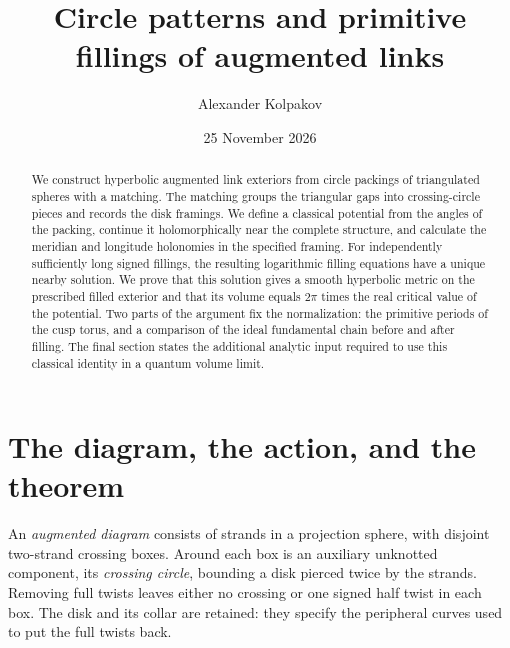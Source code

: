 \documentclass[11pt]{article}
\title{Circle patterns and primitive fillings of augmented links}
\author{Alexander Kolpakov}
\date{25 November 2026}
\numberwithin{equation}{section}
\theoremstyle{definition}
\theoremstyle{remark}
\begin{document}
\maketitle
\begin{abstract}
We construct hyperbolic augmented link exteriors from circle packings
of triangulated spheres with a matching. The matching groups the
triangular gaps into crossing-circle pieces and records the disk
framings. We define a classical potential from the angles of the
packing, continue it holomorphically near the complete structure, and
calculate the meridian and longitude holonomies in the specified
framing. For independently sufficiently long signed fillings, the
resulting logarithmic filling equations have a unique nearby solution.
We prove that this solution gives a smooth hyperbolic metric on the
prescribed filled exterior and that its volume equals $2\pi$ times the
real critical value of the potential. Two parts of the argument fix
the normalization: the primitive periods of the cusp torus, and a
comparison of the ideal fundamental chain before and after filling.
The final section states the additional analytic input required to use
this classical identity in a quantum volume limit.
\end{abstract}

\section{The diagram, the action, and the theorem}

An \emph{augmented diagram} consists of strands in a projection sphere,
with disjoint two-strand crossing boxes. Around each box is an auxiliary
unknotted component, its \emph{crossing circle}, bounding a disk pierced
twice by the strands. Removing full twists leaves either no crossing
or one signed half twist in each box. The disk and its collar are
retained: they specify the peripheral curves used to put the full
twists back.
\end{document}

